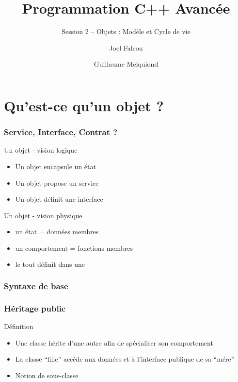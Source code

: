 \documentclass[svgnames]{beamer}
\title{Programmation C++ Avancée}
\subtitle{Session 2 -- Objets : Modèle et Cycle de vie}
\author{Joel Falcou \and Guillaume Melquiond}
\institute{Laboratoire de Recherche en Informatique}
\date{}
\begin{document}


\begin{frame}[plain]
\titlepage
\end{frame}
\setcounter{framenumber}{0}

\section{Qu'est-ce qu'un objet ?}

\frame
{
  \frametitle{Service, Interface, Contrat ?}
  \begin{block}{Un objet - vision logique}
  \begin{itemize}
  \item Un objet encapsule un état
  \item Un objet propose un service
  \item Un objet définit une interface
  \end{itemize}
  \end{block}{}
  
  \begin{block}{Un objet - vision physique}
  \begin{itemize}
  \item un état = données membres
  \item un comportement = fonctions membres
  \item le tout définit dans une 
  \end{itemize}
  \end{block}{}
}

\frame
{
  \frametitle{Syntaxe de base}
}
 
\frame
{
  \frametitle{Héritage public}
  \begin{block}{Définition}
  \begin{itemize}
  \footnotesize
  \item Une classe hérite d'une autre afin de spécialiser son comportement
  \item La classe ``fille'' accéde aux données et à l'interface publique de sa ``mére''
  \item Notion de sous-classe
  \end{itemize}


  \end{block}{}
}
\end{document}
